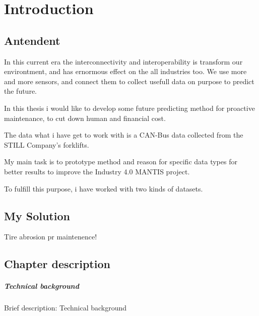 \chapter*{Introduction}
\section{Antendent}
In this current era the interconnectivity and interoperability is transform our environtment, and has ernormous effect on the all industries too. We use more and more sensors, and connect them to collect usefull data on purpose to predict the future.

In this thesis i would like to develop some future predicting method for proactive maintenance, to cut down human and financial cost.

The data what i have get to work with is a CAN-Bus data collected from the STILL Company's forklifts.

My main task is to prototype method and reason for specific data types for better results to improve the Industry 4.0 MANTIS project.

To fulfill this purpose, i have worked with two kinds of datasets.
\section{My Solution}

Tire abrosion pr maintenence!


\section{Chapter description}
		\paragraph{Technical background}

Brief description: Technical background

